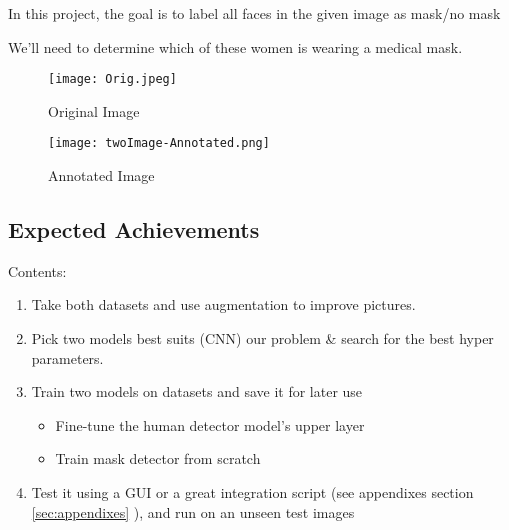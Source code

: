 In this project, the goal is to label all faces in the given image as mask/no mask

We'll need to determine which of these women is wearing a medical mask.

\begin{figure}[H]
    \centering
    \texttt{[image: Orig.jpeg]}
    \caption{Original Image}
    \label{fig:Orig}
\end{figure}


\begin{figure}[H]
    \centering
    \texttt{[image: twoImage-Annotated.png]}
    \caption{Annotated Image}
    \label{fig:Annotated}
\end{figure}

\subsection{Expected Achievements}
Contents:
\begin{enumerate}
  \item Take both datasets and use augmentation to improve pictures.
  \item Pick two models best suits (CNN) our problem \& search for the best hyper parameters.
  \item Train two models on datasets and save it for later use
  \begin{itemize}
      \item Fine-tune the human detector model's upper layer
      \item Train mask detector from scratch
  \end{itemize}
  \item Test it using a GUI or a great integration script (see appendixes section \ref{sec:appendixes} ), and run on an unseen test images
\end{enumerate}
